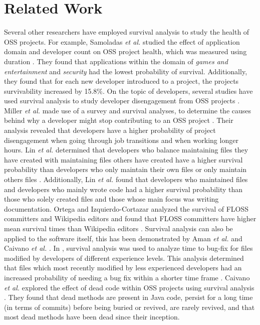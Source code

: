 \documentclass[acmconf]{acmart}
\begin{document}
\section{Related Work} \label{related}

Several other researchers have employed survival analysis to study the health of OSS projects. 
For example, Samoladas \emph{et al.} studied the effect of application domain and developer count on OSS project health, which was measured using duration \cite{samoladas2010survival}. 
They found that applications within the domain of \emph{games and entertainment} and \emph{security} had the lowest probability of survival. 
Additionally, they found that for each new developer introduced to a project, the projects survivability increased by 15.8\%. 
On the topic of developers, several studies have used survival analysis to study developer disengagement from OSS projects \cite{miller2019people,lin2017developer,ortega2009survival}. 
Miller \emph{et al.} made use of a survey and survival analyses, to determine the causes behind why a developer might stop contributing to an OSS project \cite{miller2019people}. 
Their analysis revealed that developers have a higher probability of project disengagement when going through job transitions and when working longer hours. 
Lin \emph{et al.} determined that developers who balance maintaining files they have created with maintaining files others have created have a higher survival probability than developers who only maintain their own files or only maintain others files \cite{lin2017developer}. 
Additionally, Lin \emph{et al.} found that developers who maintained files and developers who mainly wrote code had a higher survival probability than those who solely created files and those whose main focus was writing documentation. 
Ortega and Izquierdo-Cortazar analyzed the survival of FLOSS committers and Wikipedia editors and found that FLOSS committers have higher mean survival times than Wikipedia editors \cite{ortega2009survival}. 
Survival analysis can also be applied to the software itself, this has been demonstrated by Aman \emph{et al.} and Caivano \emph{et al.} \cite{aman2017survival, caivano2021exploratory}. 
In \cite{aman2017survival}, survival analysis was used to analyze time to bug-fix for files modified by developers of different experience levels. 
This analysis determined that files which most recently modified by less experienced developers had an increased probability of needing a bug fix within a shorter time frame \cite{aman2017survival}. 
Caivano \emph{et al.} explored the effect of dead code within OSS projects using survival analysis \cite{caivano2021exploratory}. 
They found that dead methods are present in Java code, persist for a long time (in terms of commits) before being buried or revived, are rarely revived, and that most dead methods have been dead since their inception. 
\end{document}
